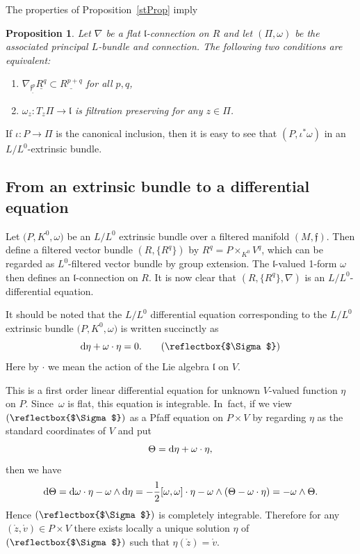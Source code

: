 \documentclass[10pt,a4paper]{amsart}
\newcommand{\f}{\mathfrak f}
\newcommand{\lf}{\mathfrak l}
\newcommand{\om}{\omega}
\DeclareRobustCommand{\amgiS}{\text{\reflectbox{$\Sigma$}}}
\newtheorem{prop}[thm]{Proposition}
\numberwithin{equation}{section}
\begin{document}
	The properties of Proposition~\ref{stProp} imply
	\begin{prop}\label{propEquiv}
		Let $\nabla$ be a flat $\lf$-connection on $R$ and let $(\Pi,\omega)$ be the associated principal $L$-bundle and connection. The following two conditions are equivalent:
		\begin{enumerate}\itemsep=0pt
		\item[$(1)$] $\nabla_{\underline{\f^p}} \underline{R^q}\subset \underline{R^{p+q}}$ for all $p,q$,
			\item[$(2)$] $\omega_z\colon T_z\Pi\to \lf$ is filtration preserving for any $z\in \Pi$.
		\end{enumerate}
	\end{prop}
	
	If $\iota\colon P\to\Pi$ is the canonical inclusion, then it is easy to see that $(P, \iota^*\omega)$ in an $L/L^0$-extrinsic bundle.


\subsection{From an extrinsic bundle to a differential equation}
Let $\big(P,K^0,\om\big)$ be an $L/L^0$ extrinsic bundle over a filtered manifold $(M,\f)$. Then define a filtered vector bundle $(R,\{R^q\})$ by $R^q=P\times_{K^0} V^q$, which can be regarded as $L^0$-filtered vector bundle by group extension. The $\lf$-valued 1-form $\omega$ then defines an $\lf$-connection on $R$. It is now clear that $\left(R,\{R^q\},\nabla\right)$ is an $L/L^0$-differential equation.

It should be noted that the $L/L^0$ differential equation corresponding to the $L/L^0$ extrinsic bundle $\big(P,K^0,\omega\big)$ is written succinctly as
\[
{\rm d}\eta + \omega\cdot\eta = 0.\tag{\amgiS}
\]
Here by $\cdot$ we mean the action of the Lie algebra $\lf$ on $V$.

This is a first order linear differential equation for unknown $V$-valued function $\eta$ on $P$. Since~$\omega$ is flat, this equation is integrable. In~fact, if we view $(\amgiS)$ as a Pfaff equation on $P\times V$ by regarding $\eta$ as the standard coordinates of $V$ and put
\[
\Theta = {\rm d}\eta + \omega\cdot\eta,
\]
then we have
\[
{\rm d}\Theta = {\rm d}\om\cdot \eta - \om\wedge {\rm d}\eta = -\frac12[\om,\om]\cdot\eta -\om\wedge (\Theta -\om\cdot\eta) = -\om\wedge \Theta.
\]
Hence $(\amgiS)$ is completely integrable. Therefore for any $(\mathring{z},\mathring{v})\in P\times V$ there exists locally a unique solution $\eta$ of $(\amgiS)$ such that $\eta(\mathring{z}) =\mathring{v}$.
\end{document}
